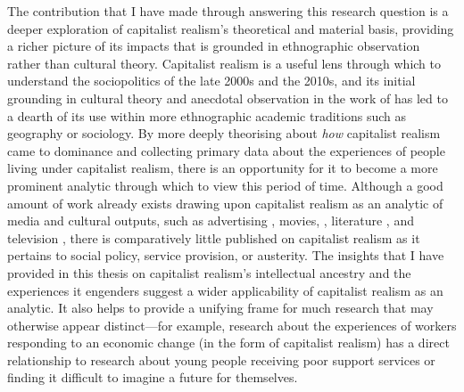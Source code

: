 The contribution that I have made through answering this research question is a deeper exploration of capitalist realism's theoretical and material basis, providing a richer picture of its impacts that is grounded in ethnographic observation rather than cultural theory. Capitalist realism is a useful lens through which to understand the sociopolitics of the late 2000s and the 2010s, and its initial grounding in cultural theory and anecdotal observation in the work of \citet{fisher_capitalist_2009} has led to a dearth of its use within more ethnographic academic traditions such as geography or sociology. By more deeply theorising about \textit{how} capitalist realism came to dominance and collecting primary data about the experiences of people living under capitalist realism, there is an opportunity for it to become a more prominent analytic through which to view this period of time. Although a good amount of work already exists drawing upon capitalist realism as an analytic of media and cultural outputs, such as advertising \citep{schudson_advertising_2013}, movies, \citep{flisfeder_love_2017}, literature \citep{jr_for_2022}, and television \citep{la_berge_capitalist_2010}, there is comparatively little published on capitalist realism as it pertains to social policy, service provision, or austerity. The insights that I have provided in this thesis on  capitalist realism's intellectual ancestry and the experiences it engenders suggest a wider applicability of capitalist realism as an analytic. It also helps to provide a unifying frame for much research that may otherwise appear distinct—for example, research about the experiences of workers responding to an economic change (in the form of capitalist realism) has a direct relationship to research about young people receiving poor support services or finding it difficult to imagine a future for themselves.  

